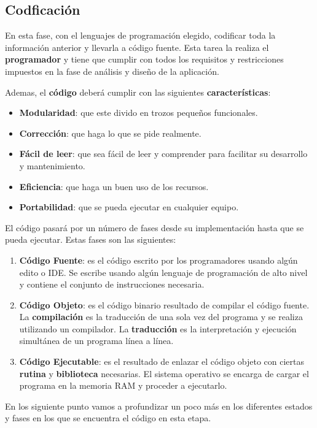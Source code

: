 \subsection{Codficación}
En esta fase, con el lenguajes de programación elegido, codificar toda la información anterior y llevarla a código fuente. Esta tarea la realiza el \textbf{programador} y tiene que cumplir con todos los requisitos y restricciones impuestos en la fase de análisis y diseño de la aplicación.

Ademas, el \textbf{código} deberá cumplir con las siguientes \textbf{características}:
\begin{itemize}
    \item \textbf{Modularidad}: que este divido en trozos pequeños funcionales.
    \item \textbf{Corrección}: que haga lo que se pide realmente.
    \item \textbf{Fácil de leer}: que sea fácil de leer y comprender para facilitar su desarrollo y mantenimiento.
    \item \textbf{Eficiencia}: que haga un buen uso de los recursos.
    \item \textbf{Portabilidad}: que se pueda ejecutar en cualquier equipo.
\end{itemize}

El código pasará por un número de fases desde su implementación hasta que se pueda ejecutar. Estas fases son las siguientes:

\begin{enumerate}
    \item \textbf{Código Fuente}: es el código escrito por los programadores usando algún edito o IDE. Se escribe usando algún lenguaje de programación de alto nivel y contiene el conjunto de instrucciones necesaria.
    \item \textbf{Código Objeto}: es el código binario resultado de compilar el código fuente. La \textbf{compilación} es la traducción de una sola vez del programa y se realiza utilizando un compilador. La \textbf{traducción} es la interpretación y ejecución simultánea de un programa línea a línea.
    \item \textbf{Código Ejecutable}: es el resultado de enlazar el código objeto con ciertas \textbf{\gls{rutina}} y \textbf{\gls{biblioteca}} necesarias. El sistema operativo se encarga de cargar el programa en la memoria RAM y proceder a ejecutarlo.
\end{enumerate}

En los siguiente punto vamos a profundizar un poco más en los diferentes estados y fases en los que se encuentra el código en esta etapa.

